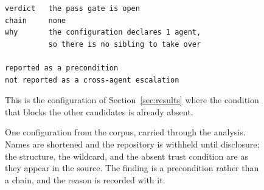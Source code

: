 \begin{figure}[t]
\begin{minipage}[t]{0.325\textwidth}
\begin{lstlisting}
verdict   the pass gate is open
chain     none
why       the configuration declares 1 agent,
          so there is no sibling to take over

reported as a precondition
not reported as a cross-agent escalation
\end{lstlisting}
\vspace{2pt}
{\scriptsize This is the \nPassRoleWide configuration of
Section~\ref{sec:results} where the condition that blocks the other
\nBlocked candidates is already absent.}
\end{minipage}
\caption{One configuration from the corpus, carried through the analysis.
Names are shortened and the repository is withheld until disclosure; the
structure, the wildcard, and the absent trust condition are as they appear in
the source. The finding is a precondition rather than a chain, and the reason
is recorded with it.}
\label{fig:worked}
\end{figure}
